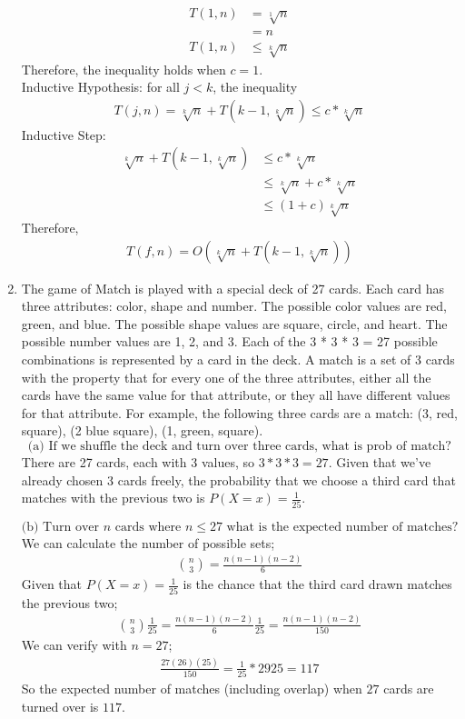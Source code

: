 \documentclass{article}
\begin{document}
\begin{enumerate}
\begin{align*}
    T(1, n) & = \sqrt[1]{n} \\
    & = n \\
    T(1, n) & \leq \sqrt[k]{n}
\end{align*}
Therefore, the inequality holds when $c = 1$. \\
Inductive Hypothesis: for all $j < k$, the inequality 
\begin{align*}
    T(j, n) = \sqrt[k]{n} + T(k-1, \sqrt[k]{n}) \leq c * \sqrt[k]{n}
\end{align*}
Inductive Step: 
\begin{align*}
    \sqrt[k]{n} + T(k-1, \sqrt[k]{n}) & \leq c * \sqrt[k]{n} \\ 
    & \leq \sqrt[k]{n} + c * \sqrt[k]{n} \\
    & \leq (1+c) \sqrt[k]{n}
\end{align*}
Therefore, 
\begin{align*}
    \boxed{T(f, n) = O(\sqrt[k]{n} + T(k-1, \sqrt[k]{n}))}
\end{align*}






\newpage
\item The game of Match is played with a special deck of 27 cards. Each card has three attributes: color, shape and number. The possible color values are red, green, and blue. The possible shape values are square, circle, and heart. The possible number values are 1, 2, and 3. Each of the 3 * 3 * 3 = 27 possible combinations is represented by a card in the deck. A match is a set of 3 cards with the property that for every one of the three attributes, either all the cards have the same value for that attribute, or they all have different values for that attribute. For example, the following three cards are a match: (3, red, square), (2 blue square), (1, green, square).
\[
\text{(a) If we shuffle the deck and turn over three cards, what is prob of match?}
\]
There are 27 cards, each with 3 values, so $3 * 3 * 3 = 27$. Given that we've already chosen 3 cards freely, the probability that we choose a third card that matches with the previous two is $P(X=x) = \frac{1}{25}$.

\[
\text{(b) Turn over } n \text{ cards where } n \leq 27 \text{ what is the expected number of matches?}
\]
We can calculate the number of possible sets;
\begin{align*}
    \binom{n}{3} = \frac{n(n-1)(n-2)}{6}
\end{align*}
Given that $P(X=x) = \frac{1}{25}$ is the chance that the third card drawn matches the previous two;
\begin{align*}
    \binom{n}{3} \frac{1}{25} = \frac{n(n-1)(n-2)}{6} \frac{1}{25} = \frac{n(n-1)(n-2)}{150}
\end{align*}
We can verify with $n=27$;
\begin{align*}
    \frac{27(26)(25)}{150} = \frac{1}{25} * 2925 = 117
\end{align*}
So the expected number of matches (including overlap) when $27$ cards are turned over is $117$.






\end{enumerate}
\end{document}
